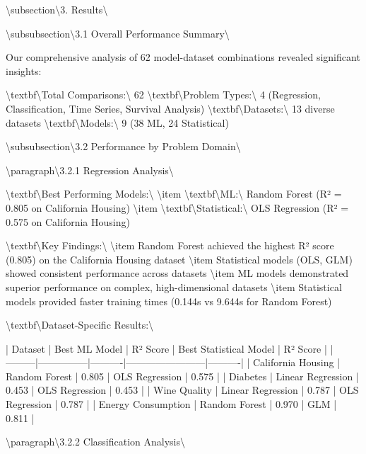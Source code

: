 \documentclass[11pt,a4paper]{article}
\begin{document}
\textbackslash{}subsection\textbackslash{}{3. Results\textbackslash{}}

\textbackslash{}subsubsection\textbackslash{}{3.1 Overall Performance Summary\textbackslash{}}

Our comprehensive analysis of 62 model-dataset combinations revealed significant insights:

\textbackslash{}textbf\textbackslash{}{Total Comparisons:\textbackslash{}} 62
\textbackslash{}textbf\textbackslash{}{Problem Types:\textbackslash{}} 4 (Regression, Classification, Time Series, Survival Analysis)
\textbackslash{}textbf\textbackslash{}{Datasets:\textbackslash{}} 13 diverse datasets
\textbackslash{}textbf\textbackslash{}{Models:\textbackslash{}} 9 (38 ML, 24 Statistical)

\textbackslash{}subsubsection\textbackslash{}{3.2 Performance by Problem Domain\textbackslash{}}

\textbackslash{}paragraph\textbackslash{}{3.2.1 Regression Analysis\textbackslash{}}

\textbackslash{}textbf\textbackslash{}{Best Performing Models:\textbackslash{}}
\textbackslash{}item \textbackslash{}textbf\textbackslash{}{ML:\textbackslash{}} Random Forest (R² = 0.805 on California Housing)
\textbackslash{}item \textbackslash{}textbf\textbackslash{}{Statistical:\textbackslash{}} OLS Regression (R² = 0.575 on California Housing)

\textbackslash{}textbf\textbackslash{}{Key Findings:\textbackslash{}}
\textbackslash{}item Random Forest achieved the highest R² score (0.805) on the California Housing dataset
\textbackslash{}item Statistical models (OLS, GLM) showed consistent performance across datasets
\textbackslash{}item ML models demonstrated superior performance on complex, high-dimensional datasets
\textbackslash{}item Statistical models provided faster training times (0.144s vs 9.644s for Random Forest)

\textbackslash{}textbf\textbackslash{}{Dataset-Specific Results:\textbackslash{}}

| Dataset | Best ML Model | R² Score | Best Statistical Model | R² Score |
|---------|---------------|----------|------------------------|----------|
| California Housing | Random Forest | 0.805 | OLS Regression | 0.575 |
| Diabetes | Linear Regression | 0.453 | OLS Regression | 0.453 |
| Wine Quality | Linear Regression | 0.787 | OLS Regression | 0.787 |
| Energy Consumption | Random Forest | 0.970 | GLM | 0.811 |

\textbackslash{}paragraph\textbackslash{}{3.2.2 Classification Analysis\textbackslash{}}
\end{document}
